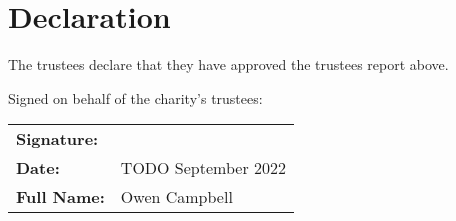 \documentclass[11pt, final]{article}
\begin{document}
    \section{Declaration}
    The trustees declare that they have approved the trustees report above.

    
    Signed on behalf of the charity's trustees:
    
    \begin{tabular}{l l}
        \textbf{Signature:}\vspace{3cm}\\
        \textbf{Date:} & TODO September 2022\vspace{1cm}\\
        \textbf{Full Name:} & Owen Campbell \\
    \end{tabular}
\end{document}
